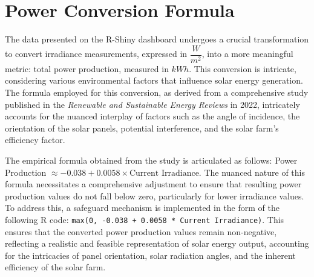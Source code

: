 \documentclass{sigchi}
\begin{document}
\section{Power Conversion Formula}
The data presented on the R-Shiny dashboard undergoes a crucial transformation to convert irradiance measurements, expressed in $\dfrac{W}{m^2}$, into a more meaningful metric: total power production, measured in $kWh$. This conversion is intricate, considering various environmental factors that influence solar energy generation. The formula employed for this conversion, as derived from a comprehensive study published in the \emph{Renewable and Sustainable Energy Reviews} in 2022\cite{8_PowerConversion}, intricately accounts for the nuanced interplay of factors such as the angle of incidence, the orientation of the solar panels, potential interference, and the solar farm's efficiency factor.

The empirical formula obtained from the study is articulated as follows: Power Production $\approx -0.038 + 0.0058 \times \text{Current Irradiance}$. The nuanced nature of this formula necessitates a comprehensive adjustment to ensure that resulting power production values do not fall below zero, particularly for lower irradiance values. To address this, a safeguard mechanism is implemented in the form of the following R code: \texttt{max(0, -0.038 + 0.0058 * Current Irradiance)}. This ensures that the converted power production values remain non-negative, reflecting a realistic and feasible representation of solar energy output, accounting for the intricacies of panel orientation, solar radiation angles, and the inherent efficiency of the solar farm.


\end{document}
